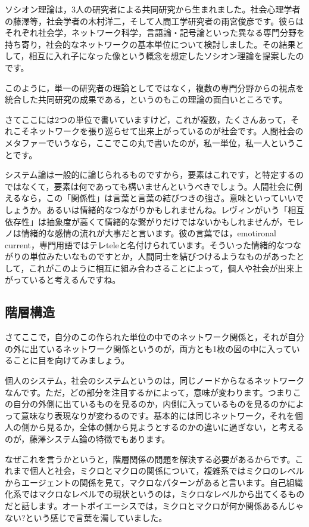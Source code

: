 \documentclass{ltjsbook}
\begin{document}
ソシオン理論は，3人の研究者による共同研究から生まれました。社会心理学者の藤澤等，社会学者の木村洋二，そして人間工学研究者の雨宮俊彦です。彼らはそれぞれ社会学，ネットワーク科学，言語論・記号論といった異なる専門分野を持ち寄り，社会的なネットワークの基本単位について検討しました。その結果として，相互に入れ子になった像という概念を想定したソシオン理論を提案したのです。

このように，単一の研究者の理論としてではなく，複数の専門分野からの視点を統合した共同研究の成果である，というのもこの理論の面白いところです。

さてここには2つの単位で書いていますけど，これが複数，たくさんあって，それこそネットワークを張り巡らせて出来上がっているのが社会です。人間社会のメタファーでいうなら，ここでこの丸で書いたのが，私一単位，私一人ということです。

システム論は一般的に論じられるものですから，要素はこれです，と特定するのではなくて，要素は何であっても構いませんというべきでしょう。人間社会に例えるなら，この「関係性」は言葉と言葉の結びつきの強さ。意味といっていいでしょうか。あるいは情緒的なつながりかもしれませんね。レヴィンがいう「相互依存性」は抽象度が高くて情緒的な繋がりだけではないかもしれませんが，モレノは情緒的な感情の流れが大事だと言います。彼の言葉では，emotironal current，専門用語ではテレteleと名付けられています。そういった情緒的なつながりの単位みたいなものですとか，人間同士を結びつけるようなものがあったとして，これがこのように相互に組み合わさることによって，個人や社会が出来上がっていると考えるんですね。


\subsection{階層構造}

さてここで，自分のこの作られた単位の中でのネットワーク関係と，それが自分の外に出ているネットワーク関係というのが，両方とも1枚の図の中に入っていることに目を向けてみましょう。

個人のシステム，社会のシステムというのは，同じノードからなるネットワークなんです。ただ，どの部分を注目するかによって，意味が変わります。つまりこの自分の外側に出ているものを見るのか，内側に入っているものを見るのかによって意味なり表現なりが変わるのです。基本的には同じネットワーク，それを個人の側から見るか，全体の側から見ようとするのかの違いに過ぎない，と考えるのが，藤澤システム論の特徴でもあります。

なぜこれを言うかというと，階層関係の問題を解決する必要があるからです。これまで個人と社会，ミクロとマクロの関係について，複雑系ではミクロのレベルからエージェントの関係を見て，マクロなパターンがあると言います。自己組織化系ではマクロなレベルでの現状というのは，ミクロなレベルから出てくるものだと話します。オートポイエーシスでは，ミクロとマクロが何か関係あるんじゃない?という感じで言葉を濁していました。
\end{document}

